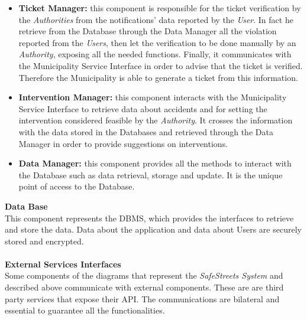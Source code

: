 \documentclass{article}
\begin{document}
\begin{itemize}
		\item {\bf Ticket Manager:} this component is responsible for the ticket verification by the {\it Authorities} from the notifications' data reported by the {\it User}. In fact he retrieve from the Database through the Data Manager all the violation reported from the {\it Users}, then let the verification to be done manually by an {\it Authority}, exposing all the needed functions. Finally, it communicates with the Municipality Service Interface in order to advise that the ticket is verified. Therefore the Municipality is able to generate a ticket from this information.
		\item {\bf Intervention Manager:} this component interacts with the Municipality Service Interface to retrieve data about accidents and for setting the intervention considered feasible by the {\it Authority}. It crosses the information with the data stored in the Databases and retrieved through the Data Manager in order to provide suggestions on interventions. 
		\item {\bf Data Manager:} this component provides all the methods to interact with the Database such as data retrieval, storage and update. It is the unique point of access to the Database. 
		\end{itemize}
		{\bf Data Base} \\
		This component represents the DBMS, which provides the interfaces to retrieve and store the data. Data about the application and data about Users are securely stored and encrypted. \\ \\ 
		{\bf External Services Interfaces} \\
		Some components of the diagrams that represent the {\it SafeStreets System} and described above communicate with external components. These are are third party services that expose their API. The communications are bilateral and essential to guarantee all the functionalities. 
\end{document}
